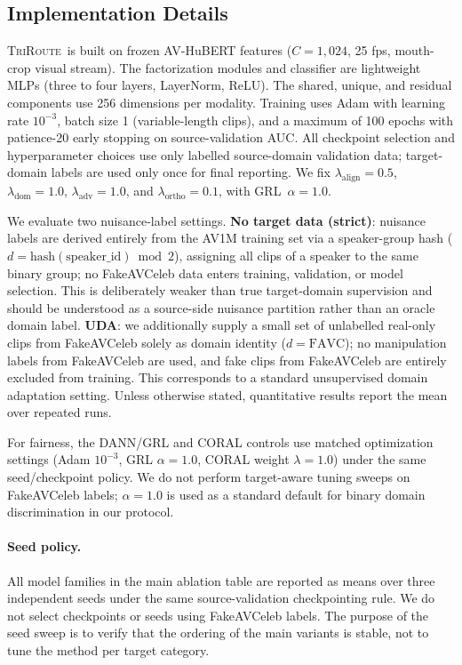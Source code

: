 \documentclass{article}
\newcommand{\method}{\textsc{TriRoute}}
\begin{document}
\subsection{Implementation Details}

\method\ is built on frozen AV-HuBERT \citep{shi2022avhubert} features ($C=1{,}024$, 25 fps, mouth-crop visual stream). The factorization modules and classifier are lightweight MLPs (three to four layers, LayerNorm, ReLU). The shared, unique, and residual components use 256 dimensions per modality. Training uses Adam with learning rate $10^{-3}$, batch size 1 (variable-length clips), and a maximum of 100 epochs with patience-20 early stopping on source-validation AUC. All checkpoint selection and hyperparameter choices use only labelled source-domain validation data; target-domain labels are used only once for final reporting. We fix $\lambda_{\mathrm{align}} = 0.5$, $\lambda_{\mathrm{dom}} = 1.0$, $\lambda_{\mathrm{adv}} = 1.0$, and $\lambda_{\mathrm{ortho}} = 0.1$, with GRL~$\alpha = 1.0$.

We evaluate two nuisance-label settings. \textbf{No target data (strict)}: nuisance labels are derived entirely from the AV1M training set via a speaker-group hash ($d = \mathrm{hash}(\mathrm{speaker\_id})\bmod 2$), assigning all clips of a speaker to the same binary group; no FakeAVCeleb data enters training, validation, or model selection. This is deliberately weaker than true target-domain supervision and should be understood as a source-side nuisance partition rather than an oracle domain label. \textbf{UDA}: we additionally supply a small set of unlabelled real-only clips from FakeAVCeleb solely as domain identity ($d = \text{FAVC}$); no manipulation labels from FakeAVCeleb are used, and fake clips from FakeAVCeleb are entirely excluded from training. This corresponds to a standard unsupervised domain adaptation setting. Unless otherwise stated, quantitative results report the mean over repeated runs.

For fairness, the DANN/GRL and CORAL controls use matched optimization settings (Adam $10^{-3}$, GRL $\alpha{=}1.0$, CORAL weight $\lambda{=}1.0$) under the same seed/checkpoint policy. We do not perform target-aware tuning sweeps on FakeAVCeleb labels; $\alpha{=}1.0$ is used as a standard default for binary domain discrimination in our protocol.

\paragraph{Seed policy.}
All model families in the main ablation table are reported as means over three independent seeds under the same source-validation checkpointing rule. We do not select checkpoints or seeds using FakeAVCeleb labels. The purpose of the seed sweep is to verify that the ordering of the main variants is stable, not to tune the method per target category.
\end{document}
